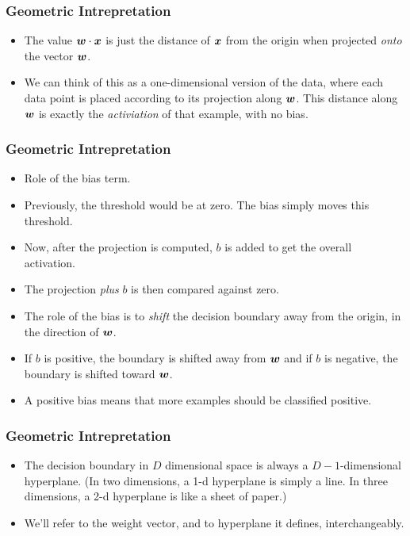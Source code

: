 \documentclass[trans]{beamer}
\begin{document}
\begin{frame}
  \frametitle{Geometric Intrepretation}
\begin{itemize}
\item
The value ${\boldsymbol{w}} \cdot {\boldsymbol{x}}$
is just the distance of ${\boldsymbol{x}}$ from the origin when projected
\emph{onto} the vector ${\boldsymbol{w}}$.
\item We can think of this as a
one-dimensional version of the data, where each data point is placed
according to its projection along ${\boldsymbol{w}}$.  This distance along ${\boldsymbol{w}}$ is
exactly the \emph{activiation} of that example, with no bias.
\end{itemize}
\end{frame}

\begin{frame}
  \frametitle{Geometric Intrepretation}
\begin{itemize}
\item
Role of the bias term.
\item 
Previously, the threshold would be at zero.  
 The bias simply moves
this threshold. 
\item Now, after the projection is computed, $b$ is added
to get the overall activation.
\item  The projection \emph{plus} $b$ is then
compared against zero.
\item The role of the bias is to
\emph{shift} the decision boundary away from the origin, in the
direction of ${\boldsymbol{w}}$.  
\item If $b$ is
positive, the boundary is shifted away from ${\boldsymbol{w}}$ and if $b$ is
negative, the boundary is shifted toward ${\boldsymbol{w}}$.  
\item A positive
bias means that more examples should be classified positive. 
\end{itemize}
\end{frame}

\begin{frame}
  \frametitle{Geometric Intrepretation}
\begin{itemize}
\item
The decision boundary in
$D$ dimensional space is always a $D-1$-dimensional hyperplane.
(In two dimensions, a 1-d hyperplane is simply a line.  In three
dimensions, a 2-d hyperplane is like a sheet of paper.) 
\item We'll
refer to the weight vector, and to hyperplane it defines,
interchangeably.
\end{itemize}
\end{frame}
\end{document}
